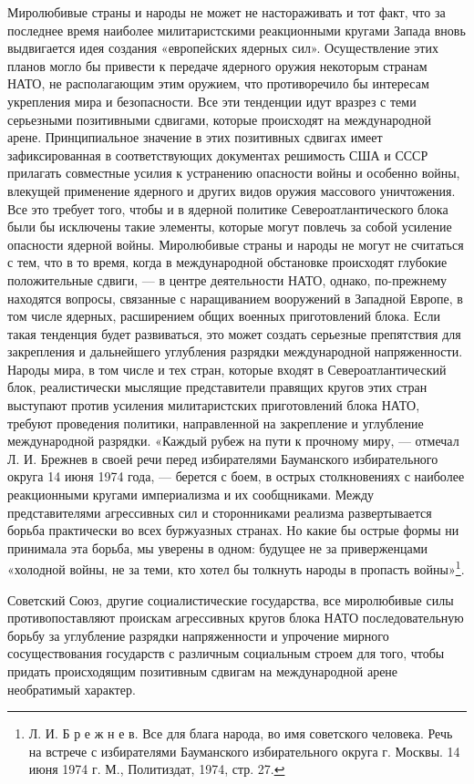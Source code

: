 \documentclass[12pt, a4paper, openany]{book}
\begin{document}
	Миролюбивые страны и народы не может не настораживать и тот факт, что за последнее время наиболее милитаристскими реакционными кругами Запада вновь выдвигается идея создания «европейских ядерных сил». Осуществление этих планов могло бы привести к передаче ядерного оружия некоторым странам НАТО, не располагающим этим оружием, что противоречило бы интересам укрепления мира и безопасности. Все эти тенденции идут вразрез с теми серьезными позитивными сдвигами, которые происходят на международной арене. Принципиальное значение в этих позитивных сдвигах имеет зафиксированная в соответствующих документах решимость США и СССР прилагать совместные усилия к устранению опасности войны и особенно войны, влекущей применение ядерного и других видов оружия массового уничтожения. Все это требует того, чтобы и в ядерной политике Североатлантического блока были бы исключены такие элементы, которые могут повлечь за собой усиление опасности ядерной войны. Миролюбивые страны и народы не могут не считаться с тем, что в то время, когда в международной обстановке происходят глубокие положительные сдвиги, — в центре деятельности НАТО, однако, по-прежнему находятся вопросы, связанные с наращиванием вооружений в Западной Европе, в том числе ядерных, расширением общих военных приготовлений блока. Если такая тенденция будет развиваться, это может создать серьезные препятствия для закрепления и дальнейшего углубления разрядки международной напряженности. Народы мира, в том числе и тех стран, которые входят в Североатлантический блок, реалистически мыслящие представители правящих кругов этих стран выступают против усиления милитаристских приготовлений блока НАТО, требуют проведения политики, направленной на закрепление и углубление международной разрядки. «Каждый рубеж на пути к прочному миру, — отмечал Л. И. Брежнев в своей речи перед избирателями Бауманского избирательного округа 14 июня 1974 года, — берется с боем, в острых столкновениях с наиболее реакционными кругами империализма и их сообщниками. Между представителями агрессивных сил и сторонниками реализма развертывается борьба практически во всех буржуазных странах. Но какие бы острые формы ни принимала эта борьба, мы уверены в одном: будущее не за приверженцами «холодной войны, не за теми, кто хотел бы толкнуть народы в пропасть войны»{\footnote{Л. И. Б р е ж н е в. Все для блага народа, во имя советского человека. Речь на встрече с избирателями Бауманского избирательного округа г. Москвы. 14 июня 1974 г. М., Политиздат, 1974, стр. 27.}}.
	
	Советский Союз, другие социалистические государства, все миролюбивые силы противопоставляют проискам агрессивных кругов блока НАТО последовательную борьбу за углубление разрядки напряженности и упрочение мирного сосуществования государств с различным социальным строем для того, чтобы придать происходящим позитивным сдвигам на международной арене необратимый характер.
	
\end{document}
